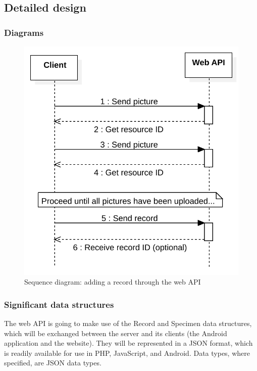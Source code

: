 \subsection{Detailed design}
\subsubsection{Diagrams}
\begin{figure}
\centering
\includegraphics[scale=0.75]{server/SequenceDiagram-AddRecord.svg}
\caption{Sequence diagram: adding a record through the web API}
\label{fig:addRecordSequenceDiagram}
\end{figure}
\subsubsection{Significant data structures}

The web API is going to make use of the Record and Specimen data structures,
which will be exchanged between the server and its clients (the Android
application and the website). They will be represented in a JSON format, which 
is readily available for use in PHP, JavaScript, and Android. Data types, where
specified, are JSON data types.

